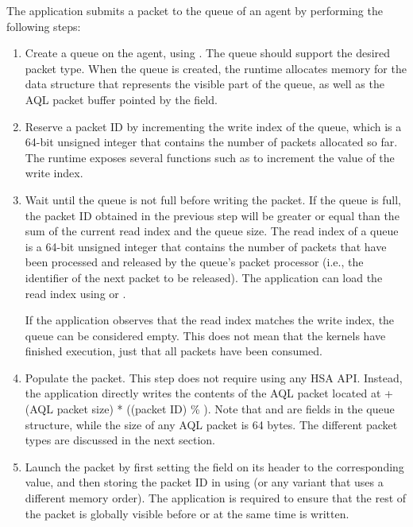 \documentclass[final,oneside]{book}
\begin{document}
The application submits a packet to the queue of an agent by performing the
following steps:
\begin{enumerate}[itemsep=1pt,topsep=3pt,partopsep=0pt]

\item Create a queue on the agent, using . The queue
  should support the desired packet type. When the queue is created, the runtime
  allocates memory for the  data structure that represents
  the visible part of the queue, as well as the AQL packet buffer pointed by the
   field.

\item Reserve a packet ID by incrementing the write index of the queue, which is
  a 64-bit unsigned integer that contains the number of packets allocated so
  far. The runtime exposes several functions such as
   to increment the value of the write
  index.

\item Wait until the queue is not full before writing the packet.  If the queue
  is full, the packet ID obtained in the previous step will be greater or equal
  than the sum of the current read index and the queue size. The read index of a
  queue is a 64-bit unsigned integer that contains the number of packets that
  have been processed and released by the queue's packet processor (i.e., the
  identifier of the next packet to be released). The application can load the
  read index using  or
  .

  If the application observes that the read index matches the write index, the
  queue can be considered empty. This does not mean that the kernels have
  finished execution, just that all packets have been consumed.

\item Populate the packet. This step does not require using any HSA
  API. Instead, the application directly writes the contents of the AQL packet
  located at  + (AQL packet size) * ((packet
  ID) \% ). Note that 
  and  are fields in the queue structure, while the
  size of any AQL packet is 64 bytes. The different packet types are discussed
  in the next section.

\item Launch the packet by first setting the 
  field on its header to the corresponding value, and then storing the packet ID
  in  using
   (or any variant that uses a different memory
  order). The application is required to ensure that the rest of the packet is
  globally visible before or at the same time 
  is written.


\end{enumerate}
\end{document}
